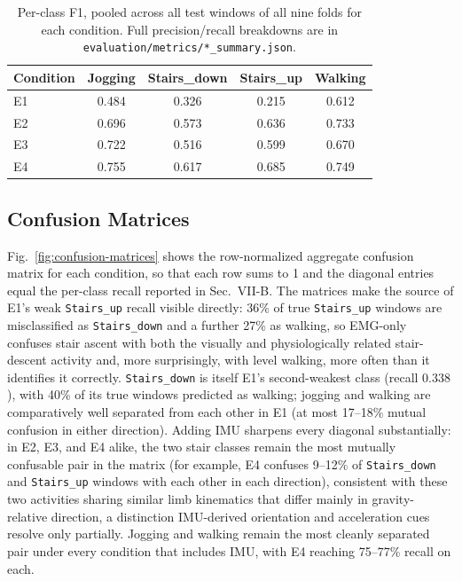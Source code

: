 \documentclass[conference]{IEEEtran}
\begin{document}
\begin{table}[t]
\centering
\caption{Per-class F1, pooled across all test windows of all nine
folds for each condition. Full precision/recall breakdowns are in
\texttt{evaluation/metrics/*\_summary.json}.}
\label{tab:per-class-f1}
\begin{tabular}{lcccc}
\toprule
Condition & Jogging & Stairs\_down & Stairs\_up & Walking \\
\midrule
E1 & 0.484 & 0.326 & 0.215 & 0.612 \\
E2 & 0.696 & 0.573 & 0.636 & 0.733 \\
E3 & 0.722 & 0.516 & 0.599 & 0.670 \\
E4 & 0.755 & 0.617 & 0.685 & 0.749 \\
\bottomrule
\end{tabular}
\end{table}

\subsection{Confusion Matrices}
\label{subsec:results-confusion}

Fig.~\ref{fig:confusion-matrices} shows the row-normalized aggregate
confusion matrix for each condition, so that each row sums to 1 and
the diagonal entries equal the per-class recall reported in
Sec.~VII-B. The matrices make the source of E1's weak
\texttt{Stairs\_up} recall visible directly: 36\% of true
\texttt{Stairs\_up} windows are misclassified as \texttt{Stairs\_down}
and a further 27\% as walking, so EMG-only confuses stair ascent with
both the visually and physiologically related stair-descent activity
and, more surprisingly, with level walking, more often than it
identifies it correctly. \texttt{Stairs\_down} is itself E1's
second-weakest class (recall $0.338$), with 40\% of its true windows
predicted as walking; jogging and walking are comparatively well
separated from each other in E1 (at most 17--18\% mutual confusion in
either direction). Adding IMU sharpens every diagonal substantially:
in E2, E3, and E4 alike, the two stair classes remain the most
mutually confusable pair in the matrix (for example, E4 confuses
9--12\% of \texttt{Stairs\_down} and \texttt{Stairs\_up} windows with
each other in each direction), consistent with these two activities
sharing similar limb kinematics that differ mainly in gravity-relative
direction, a distinction IMU-derived orientation and acceleration
cues resolve only partially. Jogging and walking remain the most
cleanly separated pair under every condition that includes IMU, with
E4 reaching 75--77\% recall on each.
\end{document}

